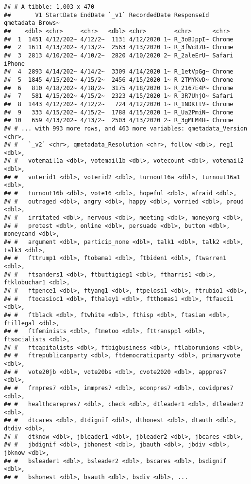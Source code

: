 \documentclass[
]{article}
\begin{document}
\begin{verbatim}
## # A tibble: 1,003 x 470
##       V1 StartDate EndDate `_v1` RecordedDate ResponseId qmetadata_Brows~
##    <dbl> <chr>     <chr>   <dbl> <chr>        <chr>      <chr>           
##  1  1451 4/12/202~ 4/12/2~  1131 4/12/2020 1~ R_3oBJppI~ Chrome          
##  2  1611 4/13/202~ 4/13/2~  2563 4/13/2020 1~ R_3fWc87B~ Chrome          
##  3  2813 4/10/202~ 4/10/2~  2820 4/10/2020 2~ R_2aleErU~ Safari iPhone   
##  4  2893 4/14/202~ 4/14/2~  3309 4/14/2020 1~ R_1etVpGg~ Chrome          
##  5  1845 4/15/202~ 4/15/2~  2456 4/15/2020 1~ R_2TMYKvD~ Chrome          
##  6   810 4/18/202~ 4/18/2~  3175 4/18/2020 1~ R_2167E4P~ Chrome          
##  7   581 4/15/202~ 4/15/2~  2323 4/15/2020 1~ R_3R7UhjO~ Safari          
##  8  1443 4/12/202~ 4/12/2~   724 4/12/2020 1~ R_1NDKttV~ Chrome          
##  9   333 4/15/202~ 4/15/2~  1788 4/15/2020 1~ R_Ua2PmiN~ Chrome          
## 10   659 4/13/202~ 4/13/2~  2503 4/13/2020 2~ R_3gMLM4H~ Chrome          
## # ... with 993 more rows, and 463 more variables: qmetadata_Version <chr>,
## #   `_v2` <chr>, qmetadata_Resolution <chr>, follow <dbl>, reg1 <dbl>,
## #   votemail1a <dbl>, votemail1b <dbl>, votecount <dbl>, votemail2 <dbl>,
## #   voterid1 <dbl>, voterid2 <dbl>, turnout16a <dbl>, turnout16a1 <dbl>,
## #   turnout16b <dbl>, vote16 <dbl>, hopeful <dbl>, afraid <dbl>,
## #   outraged <dbl>, angry <dbl>, happy <dbl>, worried <dbl>, proud <dbl>,
## #   irritated <dbl>, nervous <dbl>, meeting <dbl>, moneyorg <dbl>,
## #   protest <dbl>, online <dbl>, persuade <dbl>, button <dbl>, moneycand <dbl>,
## #   argument <dbl>, particip_none <dbl>, talk1 <dbl>, talk2 <dbl>, talk3 <dbl>,
## #   fttrump1 <dbl>, ftobama1 <dbl>, ftbiden1 <dbl>, ftwarren1 <dbl>,
## #   ftsanders1 <dbl>, ftbuttigieg1 <dbl>, ftharris1 <dbl>, ftklobuchar1 <dbl>,
## #   ftpence1 <dbl>, ftyang1 <dbl>, ftpelosi1 <dbl>, ftrubio1 <dbl>,
## #   ftocasioc1 <dbl>, fthaley1 <dbl>, ftthomas1 <dbl>, ftfauci1 <dbl>,
## #   ftblack <dbl>, ftwhite <dbl>, fthisp <dbl>, ftasian <dbl>, ftillegal <dbl>,
## #   ftfeminists <dbl>, ftmetoo <dbl>, fttransppl <dbl>, ftsocialists <dbl>,
## #   ftcapitalists <dbl>, ftbigbusiness <dbl>, ftlaborunions <dbl>,
## #   ftrepublicanparty <dbl>, ftdemocraticparty <dbl>, primaryvote <dbl>,
## #   vote20jb <dbl>, vote20bs <dbl>, cvote2020 <dbl>, apppres7 <dbl>,
## #   frnpres7 <dbl>, immpres7 <dbl>, econpres7 <dbl>, covidpres7 <dbl>,
## #   healthcarepres7 <dbl>, check <dbl>, dtleader1 <dbl>, dtleader2 <dbl>,
## #   dtcares <dbl>, dtdignif <dbl>, dthonest <dbl>, dtauth <dbl>, dtdiv <dbl>,
## #   dtknow <dbl>, jbleader1 <dbl>, jbleader2 <dbl>, jbcares <dbl>,
## #   jbdignif <dbl>, jbhonest <dbl>, jbauth <dbl>, jbdiv <dbl>, jbknow <dbl>,
## #   bsleader1 <dbl>, bsleader2 <dbl>, bscares <dbl>, bsdignif <dbl>,
## #   bshonest <dbl>, bsauth <dbl>, bsdiv <dbl>, ...
\end{verbatim}
\end{document}
